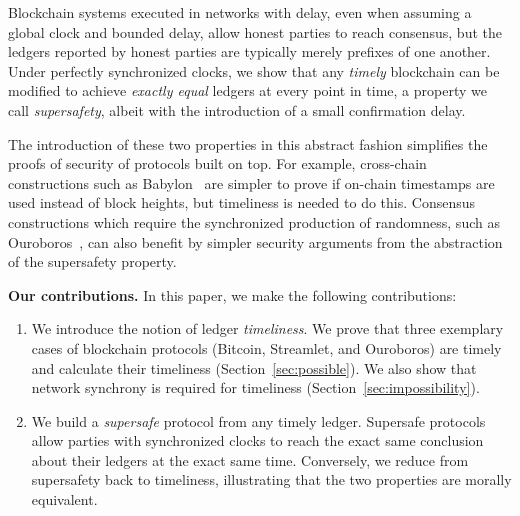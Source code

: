 Blockchain systems executed in networks with delay, even when assuming a global clock and
bounded delay, allow honest parties to reach consensus, but the ledgers reported by
honest parties are typically merely prefixes of one another.
Under perfectly synchronized clocks, we show that any \emph{timely} blockchain can be modified to achieve
\emph{exactly equal} ledgers at every point in time, a property we call \emph{supersafety},
albeit with the introduction of a small confirmation delay.

The introduction of these two
properties in this abstract fashion simplifies the proofs of security of protocols built on
top. For example, cross-chain constructions such as Babylon~\cite{babylon} are simpler
to prove if on-chain timestamps are used instead of block heights,
but timeliness is needed to do this.
Consensus constructions which require the synchronized production of randomness,
such as Ouroboros~\cite{ouroboros,praos}, can also benefit by simpler security
arguments from the abstraction of the supersafety property.

\noindent
\textbf{Our contributions.} In this paper, we make the following contributions:

\begin{enumerate}
  \item We introduce the notion of ledger \emph{timeliness}.
        We prove that three exemplary cases of blockchain protocols (Bitcoin, Streamlet, and Ouroboros)
        are timely and calculate their timeliness (Section~\ref{sec:possible}). We also show that network synchrony is required for timeliness (Section~\ref{sec:impossibility}).
  \item We build a \emph{supersafe} protocol from any timely ledger.
        Supersafe protocols allow parties with synchronized clocks to
        reach the exact same conclusion about their ledgers at the exact same time.
        Conversely, we reduce from supersafety back to timeliness, illustrating that
        the two properties are morally equivalent.
\end{enumerate}

